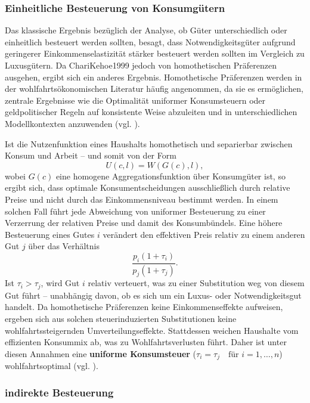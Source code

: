 \subsubsection{Einheitliche Besteuerung von Konsumgütern}

Das klassische Ergebnis bezüglich der Analyse, ob Güter unterschiedlich oder einheitlich besteuert werden sollten, besagt, dass Notwendigkeitsgüter aufgrund geringerer Einkommenselastizität stärker besteuert werden sollten im Vergleich zu Luxusgütern. Da \cite{ChariKehoe1999}{ChariKehoe1999} jedoch von homothetischen Präferenzen ausgehen, ergibt sich ein anderes Ergebnis. Homothetische Präferenzen werden in der wohlfahrtsökonomischen Literatur häufig angenommen, da sie es ermöglichen, zentrale Ergebnisse wie die Optimalität uniformer Konsumsteuern oder geldpolitischer Regeln auf konsistente Weise abzuleiten und in unterschiedlichen Modellkontexten anzuwenden (vgl. \cite{ChariChristianoKehoe1996}).

Ist die Nutzenfunktion eines Haushalts homothetisch und separierbar zwischen Konsum und Arbeit – und somit von der Form 
\[
U(c, l) = W(G(c), l),
\]
wobei \( G(c) \) eine homogene Aggregationsfunktion über Konsumgüter ist, so ergibt sich, dass optimale Konsumentscheidungen ausschließlich durch relative Preise und nicht durch das Einkommensniveau bestimmt werden. In einem solchen Fall führt jede Abweichung von uniformer Besteuerung zu einer Verzerrung der relativen Preise und damit des Konsumbündels. Eine höhere Besteuerung eines Gutes \( i \) verändert den effektiven Preis relativ zu einem anderen Gut \( j \) über das Verhältnis
\[
\frac{p_i (1 + \tau_i)}{p_j (1 + \tau_j)}.
\]
Ist \( \tau_i > \tau_j \), wird Gut \( i \) relativ verteuert, was zu einer Substitution weg von diesem Gut führt – unabhängig davon, ob es sich um ein Luxus- oder Notwendigkeitsgut handelt. Da homothetische Präferenzen keine Einkommenseffekte aufweisen, ergeben sich aus solchen steuerinduzierten Substitutionen keine wohlfahrtssteigernden Umverteilungseffekte. Stattdessen weichen Haushalte vom effizienten Konsummix ab, was zu Wohlfahrtsverlusten führt. Daher ist unter diesen Annahmen eine \textbf{uniforme Konsumsteuer} (\(\tau_i = \tau_j \quad \text{für } i = 1, \ldots, n\)) wohlfahrtsoptimal (vgl. \cite{AtkinsonStiglitz1980}).

\subsubsection{indirekte Besteuerung}

